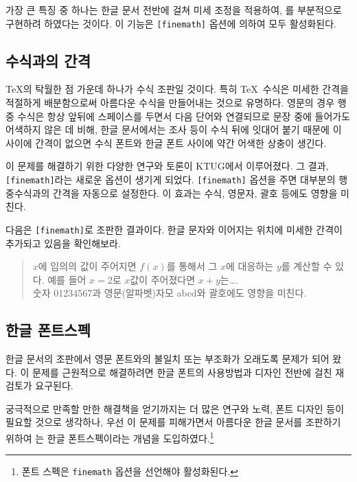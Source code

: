  가장 큰 특징 중 하나는 한글 문서 전반에
걸쳐 미세 조정을 적용하여, 를 부분적으로 구현하려
하였다는 것이다. 이 기능은 \verb|[finemath]| 옵션에 의하여 모두
활성화된다.

\subsection{수식과의 간격}

\TeX 의 탁월한 점 가운데 하나가 수식 조판일 것이다. 특히 \TeX\ 수식은
미세한 간격을 적절하게 배분함으로써 아름다운 수식을 만들어내는 것으로
유명하다. 영문의 경우 행중 수식은 항상 앞뒤에 스페이스를 두면서 다음
단어와 연결되므로 문장 중에 들어가도 어색하지 않은 데 비해, 한글 문서에서는
조사 등이 수식 뒤에 잇대어 붙기 때문에 이 사이에 간격이 없으면
수식 폰트와 한글 폰트 사이에 약간 어색한 상충이 생긴다.

이 문제를 해결하기 위한 다양한 연구와 토론이 KTUG에서 이루어졌다.
그 결과, \texttt{[finemath]}라는 새로운 옵션이 생기게 되었다.
\texttt{[finemath]} 옵션을 주면 대부분의 행중수식과의 간격을
자동으로 설정한다.
이 효과는 수식, 영문자, 괄호 등에도 영향을 미친다.


다음은 \texttt{[finemath]}로 조판한 결과이다. 한글 문자와 이어지는
위치에 미세한 간격이 추가되고 있음을 확인해보라. 

\begin{quote}
$x$에 임의의 값이 주어지면 $f(x)$를 통해서 그 $x$에 대응하는 $y$를
계산할 수 있다. 예를 들어 $x=2$로 $x$값이 주어졌다면 $x+y$는\ldots. \\
숫자 01234567과 영문(알파벳)자모 abcd와 괄호에도 영향을 미친다.
\end{quote}

\subsection{한글 폰트스펙}\label{sec:microtypo}

한글 문서의 조판에서 영문 폰트와의 불일치 또는 부조화가 오래도록
문제가 되어 왔다. 이 문제를 근원적으로 해결하려면 한글 폰트의 사용방법과
디자인 전반에 걸친 재검토가 요구된다.

궁극적으로 만족할 만한 해결책을 얻기까지는 더 많은 연구와 노력,
폰트 디자인 등이 필요할 것으로 생각하나, 우선
이 문제를 피해가면서 아름다운 한글 문서를 조판하기 위하여
\thispkg 는 한글 폰트스펙이라는 개념을 도입하였다.\footnote{%
  폰트 스펙은 \texttt{finemath} 옵션을 선언해야 활성화된다.}

